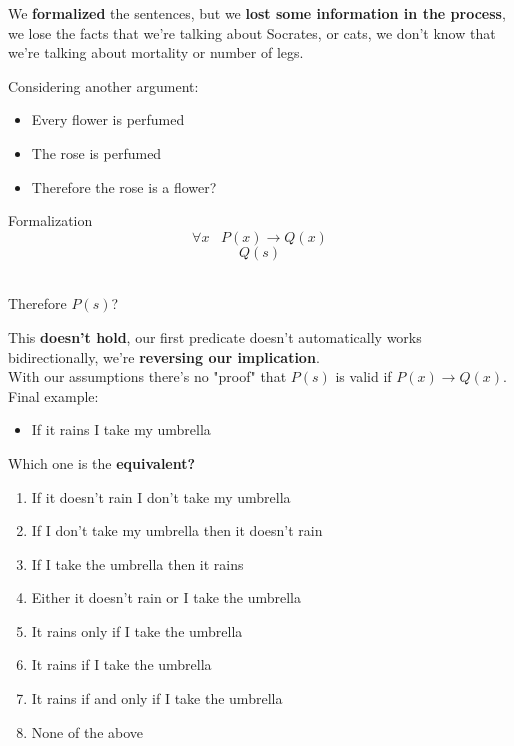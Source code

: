 \documentclass[11pt]{article}
\begin{document}
	We \textbf{formalized} the sentences, but we \textbf{lost some information in the process}, we lose the facts that we're talking about Socrates, or cats, we don't know that we're talking about mortality or number of legs. \\
	
	\newpage
	
	Considering another argument:
	\begin{itemize}
		\item Every flower is perfumed 
		\item The rose is perfumed
		\\ \bline
		\item Therefore the rose is a flower? 
	\end{itemize}
	
	Formalization
	$$\forall x\;\;\; P(x) \rightarrow Q(x)$$
	$$Q(s)$$
	\begin{center}
		\bline \\
		Therefore $P(s)$? \\
	\end{center}
	
	
	This \textbf{doesn't hold}, our first predicate doesn't automatically works bidirectionally, we're \textbf{reversing our implication}. \\
	With our assumptions there's no "proof" that $P(s)$ is valid if 
	$P(x) \rightarrow Q(x)$. \\
	
	Final example: 
	\begin{itemize}
		\item If it rains I take my umbrella
	\end{itemize}
	
	Which one is the \textbf{equivalent?}
	\begin{enumerate}
		\item If it doesn't rain I don't take my umbrella 
		\item If I don't take my umbrella then it doesn't rain 
		\item If I take the umbrella then it rains 
		\item Either it doesn't rain or I take the umbrella
		\item It rains only if I take the umbrella
		\item It rains if I take the umbrella 
		\item It rains if and only if I take the umbrella
		\item None of the above 
	\end{enumerate}
	
\end{document}
